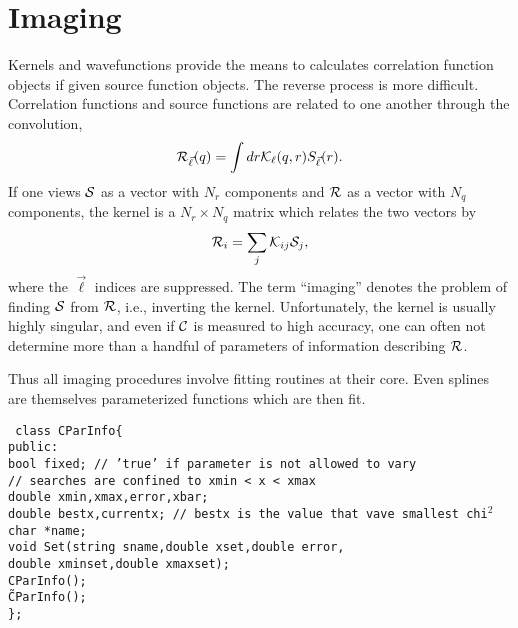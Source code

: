 \documentclass[10pt]{article}
\def\tab{\hspace*{9pt}}
\begin{document}
\section{Imaging}

Kernels and wavefunctions provide the means to calculates correlation function objects if given source function objects. The reverse process is more difficult. Correlation functions and source functions are related to one another through the convolution,
\begin{equation}
{\cal R}_{\vec{\ell}}(q)=\int dr {\cal K}_{\ell}(q,r) S_{\vec{\ell}}(r).
\end{equation}
If one views ${\cal S}$  as a vector with $N_r$ components and ${\cal R}$ as a vector with $N_q$ components, the kernel is a $N_r\times N_q$ matrix which relates the two vectors by
\begin{equation}
{\cal R}_{i}=\sum_j {\cal K}_{ij} {\cal S}_j,
\end{equation}
where the ${\vec{\ell}}$ indices are suppressed. The term ``imaging'' denotes the problem of finding ${\cal S}$ from ${\cal R}$, i.e., inverting the kernel. Unfortunately, the kernel is usually highly singular, and even if ${\cal C}$ is measured to high accuracy, one can often not determine more than a handful of parameters of information describing ${\cal R}$. 

Thus all imaging procedures involve fitting routines at their core. Even splines are themselves parameterized functions which are then fit. 

{\tt
class CParInfo\{\\
\tab public:\\
\tab\tab  bool fixed; // 'true' if parameter is not allowed to vary\\
\tab\tab  // searches are confined to  xmin < x < xmax\\
\tab\tab  double xmin,xmax,error,xbar;\\
\tab\tab  double bestx,currentx; // bestx is the value that vave smallest chi$^2$\\
\tab\tab  char *name;\\
\tab\tab  void Set(string sname,double xset,double error,\\
\tab\tab	   double xminset,double xmaxset);\\
\tab\tab  CParInfo();\\
\tab\tab  \~CParInfo();\\
\};\\
}
\end{document}
